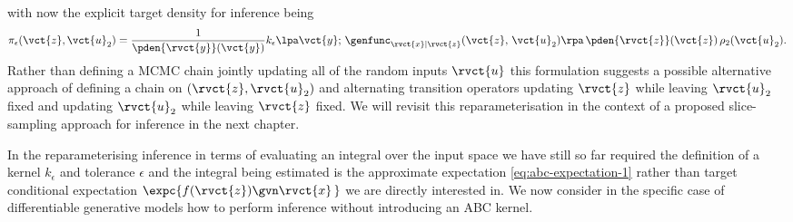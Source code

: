 with now the explicit target density for inference being
\begin{equation}\label{eq:abc-density-input-space-directed}
  \pi_\epsilon(\vct{z},\vct{u}_2) = \frac{1}{\pden{\rvct{y}}(\vct{y})} 
  k_\epsilon{\lpa\vct{y};\,\genfunc_{\rvct{x}|\rvct{z}}(\vct{z},\,\vct{u}_2)\rpa}\,\pden{\rvct{z}}(\vct{z})\,\rho_2(\vct{u}_2).
\end{equation}
Rather than defining a \ac{MCMC} chain jointly updating all of the random inputs $\rvct{u}$ this formulation suggests a possible alternative approach of defining a chain on $(\rvct{z},\rvct{u}_2)$ and alternating transition operators updating $\rvct{z}$ while leaving $\rvct{u}_2$ fixed and updating $\rvct{u}_2$ while leaving $\rvct{z}$ fixed. We will revisit this reparameterisation in the context of a proposed slice-sampling approach for inference in the next chapter.

In the reparameterising inference in terms of evaluating an integral over the input space we have still so far required the definition of a kernel $k_\epsilon$ and tolerance $\epsilon$ and the integral being estimated is the approximate expectation \eqref{eq:abc-expectation-1} rather than target conditional expectation $\expc{f(\rvct{z}) \gvn \rvct{x}\,}$ we are directly interested in. We now consider in the specific case of differentiable generative models how to perform inference without introducing an \ac{ABC} kernel.

